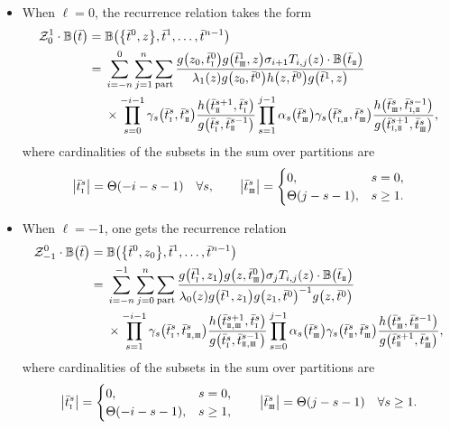 \documentclass[pdftex]{sigma}
\newcommand{\so}{\scriptscriptstyle \rm I}
\newcommand{\st}{\scriptscriptstyle \rm I\hspace{-1pt}I}
\newcommand{\sth}{\scriptscriptstyle \rm I\hspace{-1pt}I\hspace{-1pt}I}
\newcommand{\bt}{{\bar t}}
\theoremstyle{definition}
\def\BB{{\mathbb{B}}}
\def\Z{\mathcal{Z}}
\begin{document}
\begin{itemize}
\item When $\ell=0$, the recurrence relation takes the form
\begin{align}
\Z^{1}_{0}\cdot\BB\bigl(\bt\bigr)={}&\BB\bigl(\bigl\{\bt^0,z\bigr\},\bt^{1},\dots,\bt^{n-1}\bigr)\nonumber\\
={}&\sum_{i=-n}^{0}\sum_{j=1}^n\sum_{\rm part}
\frac{g\bigl(z_0,\bt^{0}_{\so}\bigr) g\bigl(\bt^{1}_{\sth},z\bigr) \sigma_{i+1}
T_{i,j}(z)\cdot \BB\bigl(\bt_{\st}\bigr)}
{\lambda_{1}(z) g\bigl(z_0,\bt^{0}\bigr) h\bigl(z,\bt^{0}\bigr)
g\bigl(\bt^{1},z\bigr)}\nonumber\\
&\times
\prod_{s=0}^{-i-1}\gamma_s\bigl(\bt^s_{\so},\bt^s_{\st}\bigr)
\frac{h\bigl(\bt^{s+1}_{\st},\bt^{s}_{\so}\bigr)}{g\bigl(\bt^s_{\so},\bt^{s-1}_{\st}\bigr)}
 \prod_{s=1}^{j-1}\alpha_s\bigl(\bt^s_{\sth}\bigr)\gamma_s\bigl(\bt^s_{{\so},{\st}},\bt^s_{\sth}\bigr)
 \frac{h\bigl(\bt^s_{\sth},\bt^{s-1}_{{\so},{\st}}\bigr)}
 {g\bigl(\bt^{s+1}_{{\so},{\st}},\bt^{s}_{\sth}\bigr)} ,\label{ex3}
\end{align}
where cardinalities of the subsets in the sum over partitions are
\[%
\big|\bt^s_{\so}\big|=\Theta(-i-s-1)\quad \forall s,
\qquad
\big|\bt^s_{\sth}\big|=\begin{cases}
0, &s=0,\\
\Theta(j-s-1), &s\geq 1.
\end{cases}
\]
\item When $\ell=-1$, one gets the recurrence
relation
\begin{align}
\Z^{0}_{-1}\cdot\BB\bigl(\bt\bigr)={}&\BB\bigl(\bigl\{\bt^0,z_0\bigr\},\bt^{1},\dots,\bt^{n-1}\bigr)\nonumber\\
={}&\sum_{i=-n}^{-1}\sum_{j=0}^n\sum_{\rm part}
\frac{g\bigl(\bt^{1}_{\so},z_1\bigr) g\bigl(z,\bt^{0}_{\sth}\bigr) \sigma_j T_{i,j}(z)\cdot \BB\bigl(\bt_{\st}\bigr)}
{\lambda_{0}(z) g\bigl(\bt^{1},z_1\bigr) g\bigl(z_1,\bt^{0}\bigr)^{-1}
g\bigl(z,\bt^{0}\bigr)}\nonumber\\
&\times
\prod_{s=1}^{-i-1}\gamma_s\bigl(\bt^s_{\so},\bt^s_{{\st},{\sth}}\bigr)
\frac{h\bigl(\bt^{s+1}_{{\st},{\sth}},\bt^{s}_{\so}\bigr)}
{g\bigl(\bt^s_{\so},\bt^{s-1}_{{\st},{\sth}}\bigr)}
 \prod_{s=0}^{j-1}\alpha_s\bigl(\bt^s_{\sth}\bigr)\gamma_s\bigl(\bt^s_{{\st}},\bt^s_{\sth}\bigr)
 \frac{h\bigl(\bt^s_{\sth},\bt^{s-1}_{{\st}}\bigr)}{g\bigl(\bt^{s+1}_{{\st}},\bt^{s}_{\sth}\bigr)} ,\label{ex4}
\end{align}
where cardinalities of the subsets in the sum over partitions are
\[%
\big|\bt^s_{\so}\big|=\begin{cases}
0,&s=0,\\
\Theta(-i-s-1), &s\geq 1,
\end{cases}
\qquad
\big|\bt^s_{\sth}\big|=
\Theta(j-s-1)\quad \forall s\geq 1.
\]
\end{itemize}
\end{document}
